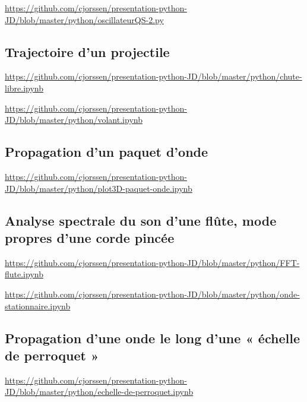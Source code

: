 \documentclass[10pt,aspectratio=169]{beamer}
\begin{document}
\begin{frame}
  \url{https://github.com/cjorssen/presentation-python-JD/blob/master/python/oscillateurQS-2.py}
\end{frame}

\subsection{Trajectoire d'un projectile}

\begin{frame}
  \url{https://github.com/cjorssen/presentation-python-JD/blob/master/python/chute-libre.ipynb}
\end{frame}

\begin{frame}
  \url{https://github.com/cjorssen/presentation-python-JD/blob/master/python/volant.ipynb}
\end{frame}

\subsection{Propagation d'un paquet d'onde}

\begin{frame}
  \url{https://github.com/cjorssen/presentation-python-JD/blob/master/python/plot3D-paquet-onde.ipynb}
\end{frame}

\subsection{Analyse spectrale du son d'une flûte, mode propres d'une corde pincée}

\begin{frame}
  \url{https://github.com/cjorssen/presentation-python-JD/blob/master/python/FFT-flute.ipynb}
\end{frame}

\begin{frame}
  \url{https://github.com/cjorssen/presentation-python-JD/blob/master/python/onde-stationnaire.ipynb}
\end{frame}

\subsection{Propagation d'une onde le long d'une « échelle de perroquet »}

\begin{frame}
  \url{https://github.com/cjorssen/presentation-python-JD/blob/master/python/echelle-de-perroquet.ipynb}
\end{frame}
\end{document}
